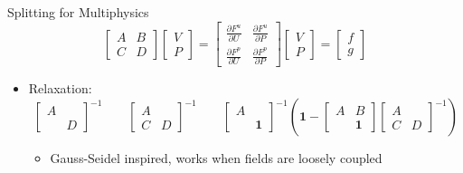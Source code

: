 \begin{frame}{Splitting for Multiphysics}
  \begin{equation*}
    \begin{bmatrix}
      A & B \\ C & D
    \end{bmatrix}
    \begin{bmatrix}
      V \\ P
    \end{bmatrix}
    =
    \begin{bmatrix}
\frac{\partial F^u}{\partial U} & \frac{\partial F^u}{\partial P}\\ \frac{\partial F^p}{\partial U} & \frac{\partial F^p}{\partial P}
    \end{bmatrix}
    \begin{bmatrix}
      V \\ P
    \end{bmatrix}
    =
    \begin{bmatrix}
      f \\ g
    \end{bmatrix}
  \end{equation*}
  \begin{itemize}\item Relaxation:
    \begin{equation*}
      \begin{bmatrix}
        A & \\  & D
      \end{bmatrix}^{-1} \qquad 
      \begin{bmatrix}
        A & \\ C & D
      \end{bmatrix}^{-1} \qquad
      \begin{bmatrix}
        A & \\  & \bm 1
      \end{bmatrix}^{-1}
      \left(
        \bm 1 -
        \begin{bmatrix}
          A & B \\ & \bm 1
        \end{bmatrix}
        \begin{bmatrix}
          A & \\ C & D
        \end{bmatrix}^{-1}
      \right)
    \end{equation*}
    \begin{itemize}
    \item Gauss-Seidel inspired, works when fields are loosely coupled

\end{itemize}
\end{itemize}
\end{frame}
